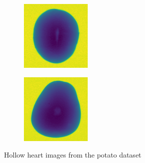 \documentclass[11pt]{article}
\begin{document}
\begin{figure}[!h]
\begin{subfigure}[b]{0.22\textwidth}
         \caption{}
         \label{fig:hollow_17}
     \end{subfigure}
     \hfill
     \begin{subfigure}[b]{0.22\textwidth}
         \centering
         \includegraphics[width=\textwidth]{figurer/potato_dataset/hollow/hollow_18.jpg}
         \caption{}
         \label{fig:hollow_18}
     \end{subfigure}
     \hfill
     \begin{subfigure}[b]{0.22\textwidth}
         \centering
         \includegraphics[width=\textwidth]{figurer/potato_dataset/hollow/hollow_19.jpg}
         \caption{}
         \label{fig:hollow_19}
     \end{subfigure}
     \caption{Hollow heart images from the potato dataset}
    \end{figure}
\end{document}
